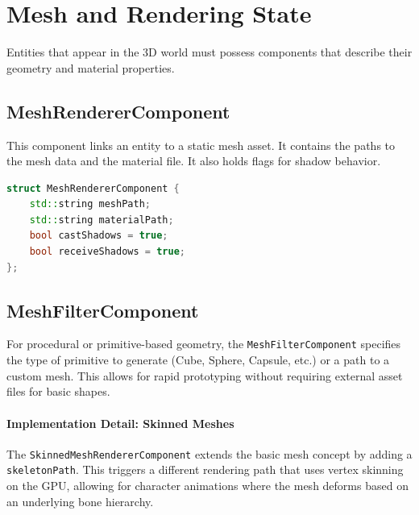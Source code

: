 \section{Mesh and Rendering State}

Entities that appear in the 3D world must possess components that describe their geometry and material properties.

\subsection{MeshRendererComponent}

This component links an entity to a static mesh asset. It contains the paths to the mesh data and the material file. It also holds flags for shadow behavior.

\begin{lstlisting}[language=C++]
struct MeshRendererComponent {
    std::string meshPath;
    std::string materialPath;
    bool castShadows = true;
    bool receiveShadows = true;
};
\end{lstlisting}

\subsection{MeshFilterComponent}

For procedural or primitive-based geometry, the \texttt{MeshFilterComponent} specifies the type of primitive to generate (Cube, Sphere, Capsule, etc.) or a path to a custom mesh. This allows for rapid prototyping without requiring external asset files for basic shapes.


\paragraph{Implementation Detail: Skinned Meshes}

The \texttt{SkinnedMeshRendererComponent} extends the basic mesh concept by adding a \texttt{skeletonPath}. This triggers a different rendering path that uses vertex skinning on the GPU, allowing for character animations where the mesh deforms based on an underlying bone hierarchy.


